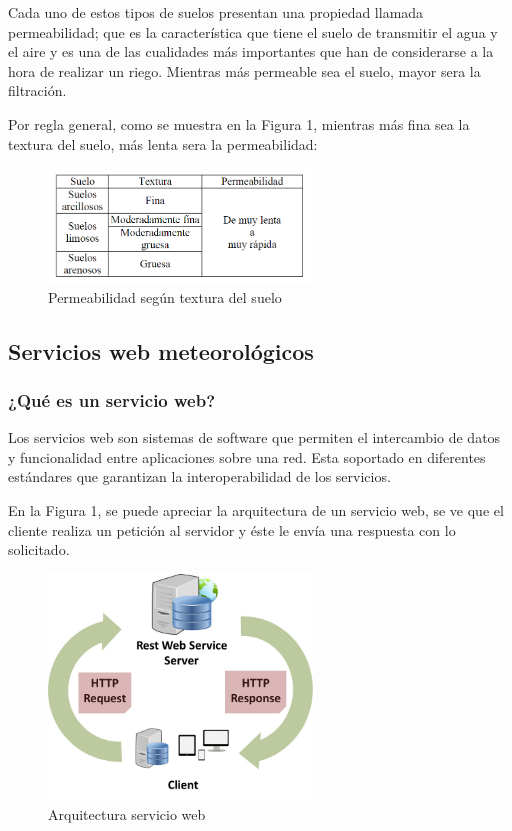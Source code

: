 \documentclass[11pt,letterpaper]{article}
\begin{document}
Cada uno de estos tipos de suelos presentan una propiedad llamada permeabilidad; que es la característica que tiene el suelo de transmitir el agua y el aire y es una de las cualidades más importantes que han de considerarse a la hora de realizar un riego. Mientras más permeable sea el suelo, mayor sera la filtración.

Por regla general, como se muestra en la Figura 1, mientras más fina sea la textura del suelo, más lenta sera la permeabilidad:

\begin{figure}[ht!]
\caption{Permeabilidad según textura del suelo}
\centering
\includegraphics[width=7cm]{permeabilidad}
\end{figure}


\subsection{Servicios web meteorológicos}


\subsubsection{¿Qué es un servicio web?}

Los servicios web son sistemas de software que permiten el intercambio de datos y funcionalidad entre aplicaciones sobre una red. Esta soportado en diferentes 
estándares que garantizan la interoperabilidad de los servicios.\citep{webService}

En la Figura 1, se puede apreciar la arquitectura de un servicio web, se ve que el cliente realiza un petición al servidor y éste le envía una respuesta con lo solicitado.

\begin{figure}[ht!]
\caption{Arquitectura servicio web}
\centering
\includegraphics[width=7cm]{rest}
\end{figure}
\end{document}
